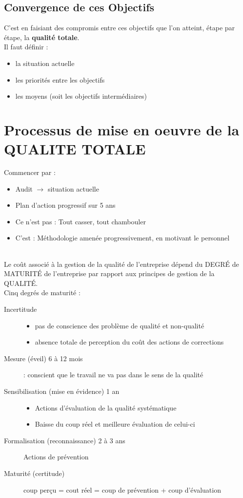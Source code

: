 	\subsection{Convergence de ces Objectifs}
C’est en faisiant des compromis entre ces objectifs que l’on atteint, étape par étape, la \textbf{qualité totale}.\\ 
Il faut définir : 
	\begin{itemize}
	\item la situation actuelle
	\item les priorités entre les objectifs
	\item les moyens (soit les objectifs intermédiaires)
	\end{itemize}


\section{Processus de mise en oeuvre de la QUALITE TOTALE}

Commencer par :
\begin{itemize}
	\item Audit $\rightarrow$ situation actuelle
	\item Plan d'action progressif sur 5 ans
	\item Ce n’est pas : Tout casser, tout chambouler
	\item C’est : Méthodologie amenée progressivement, en motivant le personnel
\end{itemize}
\hfill\\

Le coût associé à la gestion de la qualité de l'entreprise dépend du DEGRÉ de MATURITÉ de l'entreprise par rapport aux principes de gestion de la QUALITÉ.\\
Cinq degrés de maturité :
\begin{description}
\item[Incertitude]
	\begin{itemize}
	\item pas de conscience des problème de qualité et non-qualité
	\item absence totale de perception du coût des actions de corrections
	\end{itemize}
\item[Mesure (éveil) 6 à 12 mois] : conscient que le travail ne va pas dans le sens de la qualité
\item[Sensibilisation (mise en évidence) 1 an]
	\begin{itemize}
	\item Actions d’évaluation de la qualité systématique
	\item Baisse du coup réel et meilleure évaluation de celui-ci
	\end{itemize}
\item[Formalisation (reconnaissance) 2 à 3 ans] Actions de prévention
\item[Maturité (certitude)] coup perçu = cout réel = coup de prévention + coup d’évaluation
\end{description}
\hfill\\

